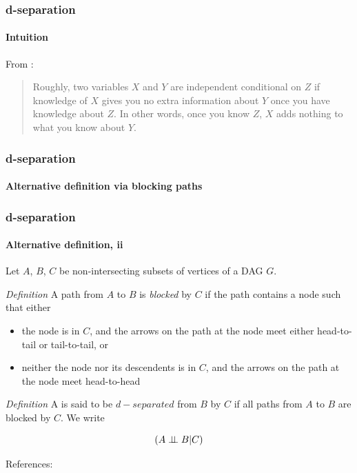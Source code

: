 \begin{frame}
\frametitle{d-separation}
\framesubtitle{Intuition}
From \cite{scheines-tutorial}: \newline

\begin{quote}
Roughly, two variables $X$ and $Y$ are independent conditional on $Z$ if knowledge of $X$ gives you no extra information about $Y$ once you have knowledge about $Z$. In other words, once you know $Z$, $X$ adds nothing to what you know about $Y$.
\end{quote}

\end{frame}

\begin{frame}
    \frametitle{d-separation}
    \framesubtitle{Alternative definition via blocking paths}
    
 
\end{frame}

\begin{frame}
    \frametitle{d-separation}
    \framesubtitle{Alternative definition, ii}

    Let $A$, $B$, $C$ be non-intersecting subsets of vertices of a DAG $G$. \newline

    \emph{Definition} A path from $A$ to $B$ is \emph{blocked} by $C$ if the path contains a node such that either

    \begin{itemize}
    \item the node is in $C$, and the arrows on the path at the node meet either head-to-tail or tail-to-tail, or
    \item neither the node nor its descendents is in $C$, and the arrows on the path at the node meet head-to-head \newline
    \end{itemize}

    \emph{Definition} A is said to be $d-separated$ from $B$ by $C$ if all paths from $A$ to $B$ are blocked by $C$. We write

    \begin{equation*}
        (A \perp\!\!\!\perp B | C)
    \end{equation*}

    References: \cite{tum-graphical}

    
\end{frame}


